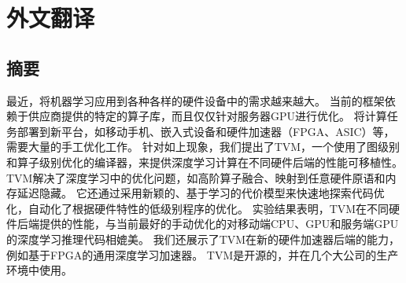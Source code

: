\cleardoublepage
\chapter{外文翻译}

\section*{摘要}

最近，将机器学习应用到各种各样的硬件设备中的需求越来越大。
当前的框架依赖于供应商提供的特定的算子库，而且仅仅针对服务器GPU进行优化。
将计算任务部署到新平台，如移动手机、嵌入式设备和硬件加速器（FPGA、ASIC）等，需要大量的手工优化工作。
针对如上现象，我们提出了TVM，一个使用了图级别和算子级别优化的编译器，来提供深度学习计算在不同硬件后端的性能可移植性。
TVM解决了深度学习中的优化问题，如高阶算子融合、映射到任意硬件原语和内存延迟隐藏。
它还通过采用新颖的、基于学习的代价模型来快速地探索代码优化，自动化了根据硬件特性的低级别程序的优化。
实验结果表明，TVM在不同硬件后端提供的性能，与当前最好的手动优化的对移动端CPU、GPU和服务端GPU的深度学习推理代码相媲美。
我们还展示了TVM在新的硬件加速器后端的能力，例如基于FPGA的通用深度学习加速器。
TVM是开源的，并在几个大公司的生产环境中使用。

